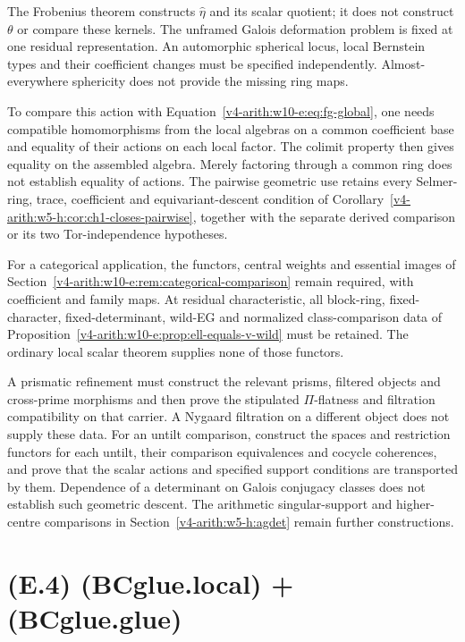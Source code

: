 The Frobenius theorem constructs $\widehat\eta$ and its scalar quotient;
it does not construct $\theta$ or compare these kernels. The unframed
Galois deformation problem is fixed at one residual representation.
An automorphic spherical locus, local Bernstein types and their
coefficient changes must be specified independently. Almost-everywhere
sphericity does not provide the missing ring maps.

To compare this action with Equation~\eqref{v4-arith:w10-e:eq:fg-global},
one needs compatible homomorphisms from the local algebras on a common
coefficient base and equality of their actions on each local factor.
The colimit property then gives equality on the assembled algebra.
Merely factoring through a common ring does not establish equality of
actions. The pairwise geometric use retains every Selmer-ring, trace,
coefficient and equivariant-descent condition of
Corollary~\ref{v4-arith:w5-h:cor:ch1-closes-pairwise}, together with
the separate derived comparison or its two Tor-independence hypotheses.

For a categorical application, the functors, central weights and
essential images of Section~\ref{v4-arith:w10-e:rem:categorical-comparison}
remain required, with coefficient and family maps. At residual
characteristic, all block-ring, fixed-character, fixed-determinant,
wild-EG and normalized class-comparison data of
Proposition~\ref{v4-arith:w10-e:prop:ell-equals-v-wild} must be retained.
The ordinary local scalar theorem supplies none of those functors.

A prismatic refinement must construct the relevant prisms, filtered
objects and cross-prime morphisms and then prove the stipulated
$\Pi$-flatness and filtration compatibility on that carrier. A Nygaard
filtration on a different object does not supply these data.
For an untilt comparison, construct the spaces and restriction functors
for each untilt, their comparison equivalences and cocycle coherences,
and prove that the scalar actions and specified support conditions are
transported by them. Dependence of a determinant on Galois conjugacy
classes does not establish such geometric descent. The arithmetic
singular-support and higher-centre comparisons in
Section~\ref{v4-arith:w5-h:agdet} remain further constructions.

\section{(E.4) (BCglue.local) + (BCglue.glue)}
\label{v4-arith:w10-e:combined}

